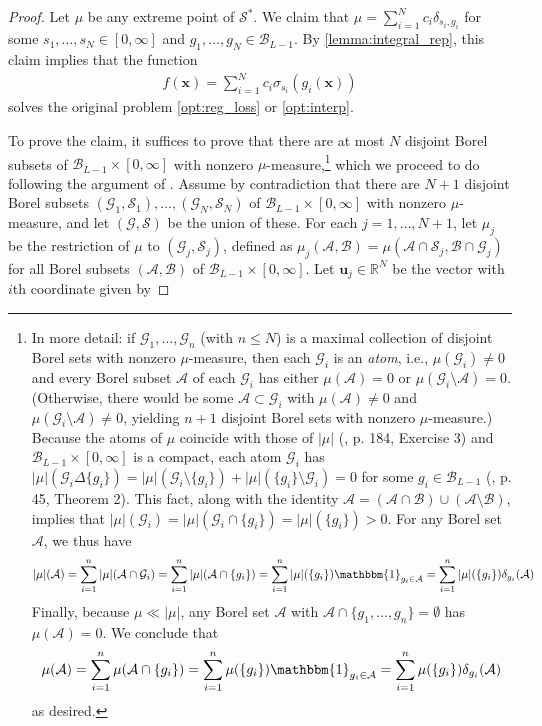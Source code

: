 \documentclass{article}
\def\vu{{\bm{u}}}
\def\vx{{\bm{x}}}
\def\cA{{\mathcal{A}}}
\def\cB{{\mathcal{B}}}
\def\cG{{\mathcal{G}}}
\def\cS{{\mathcal{S}}}
\newcommand{\R}{\mathbb{R}}
\begin{document}
\begin{appendices}
\begin{proof}
    Let $\mu$ be any extreme point of $\cS^*$. We claim that $\mu = \sum_{i=1}^N c_i \delta_{s_i,g_i}$ for some $s_1, \dots, s_N \in [0,\infty]$ and $g_1, \dots, g_N \in \cB_{L-1}$. By \cref{lemma:integral_rep}, this claim implies that the function 
    \begin{align}
        f(\vx) = \sum_{i=1}^N c_i \sigma_{s_i} (g_i(\vx))
    \end{align}
    solves the original problem \eqref{opt:reg_loss} or \eqref{opt:interp}. 
    
    To prove the claim, it suffices to prove that there are at most $N$ disjoint Borel subsets of $\cB_{L-1} \times [0,\infty]$ with nonzero $\mu$-measure,\footnote{In more detail: if $\cG_1, \dots, \cG_n$ (with $n \leq N$) is a maximal collection of disjoint Borel sets with nonzero $\mu$-measure, then each $\cG_i$ is an \textit{atom}, i.e., $\mu(\cG_i) \neq 0$ and every Borel subset $\cA$ of each $\cG_i$ has either $\mu(\cA) = 0$ or $\mu(\cG_i \setminus \cA) = 0$. (Otherwise, there would be some $\cA \subset \cG_i$ with $\mu(\cA) \neq 0$ and $\mu(\cG_i \setminus \cA) \neq 0$, yielding $n+1$ disjoint Borel sets with nonzero $\mu$-measure.) Because the atoms of $\mu$ coincide with those of $|\mu|$ (\cite{kadets2018course}, p. 184, Exercise 3) and $\cB_{L-1} \times [0,\infty]$ is a compact, each atom $\cG_i$ has $|\mu|(\cG_i \Delta \{ g_i \}) = |\mu|(\cG_i  \setminus \{ g_i \}) + |\mu|(\{g_i\} \setminus \cG_i)  = 0$ for some $g_i \in \cB_{L-1}$ (\cite{kadets2018course}, p. 45, Theorem 2). This fact, along with the identity $\cA = (\cA \cap \cB) \cup (\cA \setminus \cB)$, implies that $|\mu|(\cG_i) = |\mu|(\cG_i \cap \{ g_i \}) = |\mu|(\{ g_i \} ) > 0$. For any Borel set $\cA$, we thus have
    \begin{equation}
        |\mu|(\cA) = \sum_{i=1}^n |\mu|(\cA \cap \cG_i) = \sum_{i=1}^n |\mu|(\cA \cap \{ g_i \}) = \sum_{i=1}^n |\mu|(\{g_i\}) \mathbbm{1}_{g_i \in \cA} = \sum_{i=1}^n |\mu|(\{g_i\}) \delta_{g_i}(\cA)
    \end{equation}
    Finally, because $\mu \ll |\mu|$, any Borel set $\cA$ with $\cA \cap \{g_1, \dots, g_n \} = \emptyset$ has $\mu(\cA) = 0$. We conclude that
    \begin{equation}
        \mu(\cA) = \sum_{i=1}^n \mu(\cA \cap \{ g_i \}) = \sum_{i=1}^n \mu(\{g_i\}) \mathbbm{1}_{g_i \in \cA} = \sum_{i=1}^n \mu(\{g_i\}) \delta_{g_i}(\cA)
    \end{equation}
    as desired.
    } which we proceed to do following the argument of \cite{fisher1975spline}. Assume by contradiction that there are $N+1$ disjoint Borel subsets $(\cG_1, \cS_1), \dots, (\cG_N, \cS_N)$ of $\cB_{L-1} \times [0,\infty]$ with nonzero $\mu$-measure, and let $(\cG, \cS)$ be the union of these. For each $j = 1, \dots, N+1$, let $\mu_j$ be the restriction of $\mu$ to $(\cG_j, \cS_j)$, defined as $\mu_j(\cA, \cB) = \mu(\cA \cap \cS_j, \cB \cap \cG_j)$ for all Borel subsets $(\cA, \cB)$ of $\cB_{L-1} \times [0,\infty]$. Let $\vu_j \in \R^{N}$ be the vector with $i$th coordinate given by

\end{proof}
\end{appendices}
\end{document}
